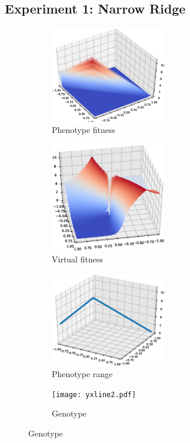 \documentclass[letterpaper]{article}
\begin{document}
\subsection{Experiment 1: Narrow Ridge}

\begin{figure}[t]
   \centering
   \begin{subfigure}[b]{0.2\textwidth}
   \includegraphics[width=2in]{yxline2-phfunc.eps}
   \caption{Phenotype fitness}
   \label{yxline2-phfunc}
   \end{subfigure}
   \begin{subfigure}[b]{0.2\textwidth}
   \includegraphics[width=2in]{yxline2-vfunc.eps}
   \caption{Virtual fitness}
   \label{yxline2-vfunc}
   \end{subfigure}
   \begin{subfigure}[b]{0.2\textwidth}
   \includegraphics[width=2in]{yxline2-phrange.eps}
   \caption{Phenotype range}
   \label{yxline2-phrange}
   \end{subfigure}
   \begin{subfigure}[b]{0.2\textwidth}
   \texttt{[image: yxline2.pdf]}
   \caption{Genotype}
   \label{yxline2-genotype}
   \end{subfigure}


\end{figure}
\end{document}
